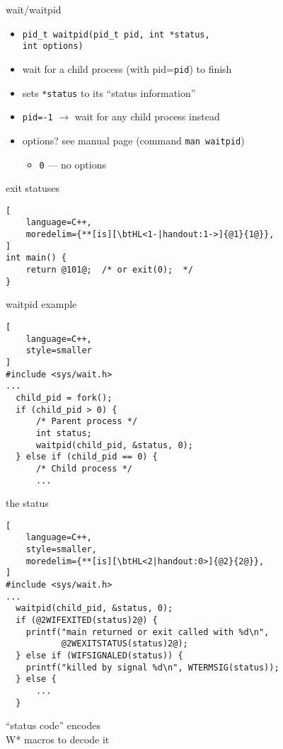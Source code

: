 \begin{frame}{wait/waitpid}
\begin{itemize}
\item \texttt{pid\_t waitpid(pid\_t pid, int *status, \\
              \hspace{5cm} int options)}
\item wait for a child process (with pid=\texttt{pid}) to finish
\item sets \texttt{*status} to its ``status information''
\vspace{.5cm}
\item \texttt{pid=-1} $\rightarrow$ wait for any child process instead
\item options? see manual page (command \texttt{man waitpid})
    \begin{itemize}
        \item \texttt{0} --- no options
    \end{itemize}
\end{itemize}
\end{frame}

\begin{frame}[fragile,label=exitStatuses]{exit statuses}
\begin{lstlisting}[
    language=C++,
    moredelim={**[is][\btHL<1-|handout:1->]{@1}{1@}},
]
int main() {
    return @101@;  /* or exit(0);  */
}
\end{lstlisting}
\end{frame}

\begin{frame}[fragile,label=waitpidExample]{waitpid example}
\begin{lstlisting}[
    language=C++,
    style=smaller
]
#include <sys/wait.h>
...
  child_pid = fork();
  if (child_pid > 0) {
      /* Parent process */
      int status;
      waitpid(child_pid, &status, 0);
  } else if (child_pid == 0) {
      /* Child process */
      ...
\end{lstlisting}
\end{frame}

\begin{frame}[fragile,label=extractStatus]{the status}
\begin{lstlisting}[
    language=C++,
    style=smaller,
    moredelim={**[is][\btHL<2|handout:0>]{@2}{2@}},
]
#include <sys/wait.h>
...
  waitpid(child_pid, &status, 0);
  if (@2WIFEXITED(status)2@) {
    printf("main returned or exit called with %d\n",
           @2WEXITSTATUS(status)2@);
  } else if (WIFSIGNALED(status)) {
    printf("killed by signal %d\n", WTERMSIG(status));
  } else {
      ...
  }
\end{lstlisting}
``status code'' encodes  \\
W* macros to decode it
\end{frame}

